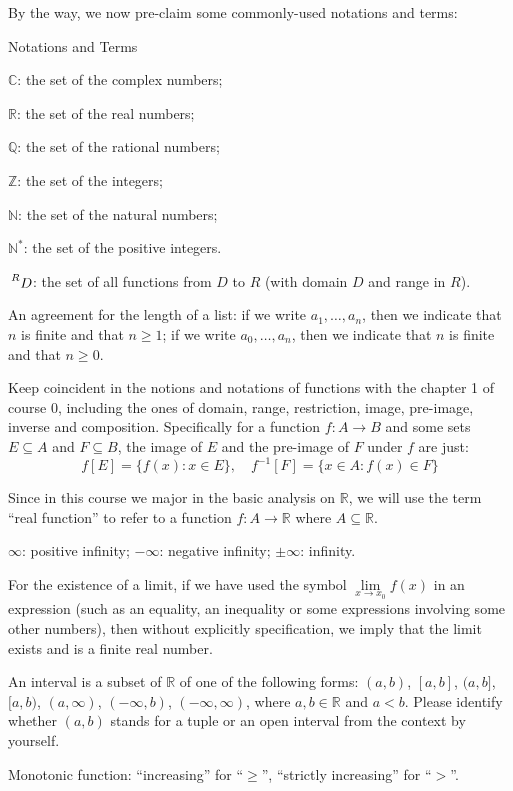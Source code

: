 \documentclass{article}
\begin{document}
By the way, we now pre-claim some commonly-used notations and terms:
\begin{Df}{Notations and Terms}
    \begin{compactenum}
    \item $\mathbb{C}$: the set of the complex numbers;
    \item $\mathbb{R}$: the set of the real numbers;
    \item $\mathbb{Q}$: the set of the rational numbers;
    \item $\mathbb{Z}$: the set of the integers;
    \item $\mathbb{N}$: the set of the natural numbers;
    \item $\mathbb{N^\ast}$: the set of the positive integers.
    \item $\sideset{^R}{}{\mathop{D}}$: the set of all functions from $D$ to $R$ (with domain $D$ and range in $R$).
    \item An agreement for the length of a list: if we write $a_1, \dots, a_n$, then we indicate that $n$ is finite and that $n\geq 1$; if we write $a_0, \dots, a_n$, then we indicate that $n$ is finite and that $n\geq 0$.
    \item Keep coincident in the notions and notations of functions with the chapter 1 of course 0, including the ones of domain, range, restriction, image, pre-image, inverse and composition. Specifically for a function $f: A\rightarrow B$ and some sets $E\subseteq A$ and $F\subseteq B$, the image of $E$ and the pre-image of $F$ under $f$ are just:
    $$f[E] = \{f(x): x\in E\},\quad f^{-1}[F] = \{x\in A: f(x)\in F\}$$
    \item Since in this course we major in the basic analysis on $\mathbb{R}$, we will use the term ``real function'' to refer to a function $f: A\rightarrow \mathbb{R}$ where $A\subseteq \mathbb{R}$.
    \item $\infty$: positive infinity; $-\infty$: negative infinity; $\pm\infty$: infinity.
    \item For the existence of a limit, if we have used the symbol $\lim\limits_{x\to x_0} f(x)$ in an expression (such as an equality, an inequality or some expressions involving some other numbers), then without explicitly specification, we imply that the limit exists and is a finite real number.
    \item An interval is a subset of $\mathbb{R}$ of one of the following forms: $(a,b)$, $[a,b]$, $(a,b]$, $[a,b)$, $(a, \infty)$, $(-\infty, b)$, $(-\infty, \infty)$, where $a, b\in\mathbb{R}$ and $a<b$. Please identify whether $(a,b)$ stands for a tuple or an open interval from the context by yourself.
    \item Monotonic function: ``increasing'' for ``$\geq$'', ``strictly increasing'' for ``$>$''.
\end{compactenum} 
\end{Df}
\end{document}
